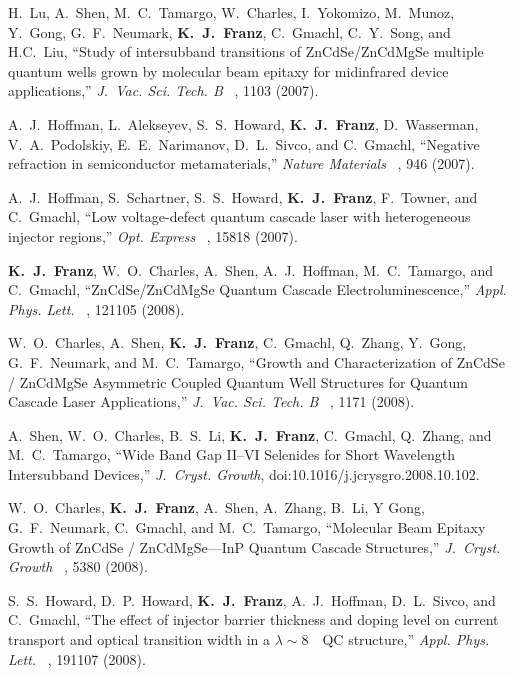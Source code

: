 \begin{list}{}{
  \setlength{\leftmargin}{0.25in}
  \setlength{\rightmargin}{0.25in}
  \setlength{\itemsep}{6pt}
}
\item H.~Lu, A.~Shen, M.~C.~Tamargo, W.~Charles, I.~Yokomizo, M.~Munoz, Y.~Gong, G.~F.~Neumark, \textbf{K.~J.~Franz}, C.~Gmachl, C.~Y.~Song, and H.C.~Liu, ``Study of intersubband transitions of ZnCdSe/ZnCdMgSe multiple quantum wells grown by molecular beam epitaxy for midinfrared device applications,'' \emph{J.~Vac. Sci. Tech. B}~ , 1103 (2007).
\item A.~J.~Hoffman, L.~Alekseyev, S.~S.~Howard, \textbf{K.~J.~Franz}, D.~Wasserman, V.~A.~Podolskiy, E.~E.~Narimanov, D.~L.~Sivco, and C.~Gmachl, ``Negative refraction in semiconductor metamaterials,'' \emph{Nature Materials}~ , 946 (2007).
\item A.~J.~Hoffman, S.~Schartner, S.~S.~Howard, \textbf{K.~J.~Franz}, F.~Towner, and C.~Gmachl, ``Low voltage-defect quantum cascade laser with heterogeneous injector regions,'' \emph{Opt. Express}~ , 15818 (2007).
\item \textbf{K.~J.~Franz}, W.~O.~Charles, A.~Shen, A.~J.~Hoffman, M.~C.~Tamargo, and C.~Gmachl, ``ZnCdSe/ZnCdMgSe Quantum Cascade Electroluminescence,'' \emph{Appl. Phys. Lett.}~  , 121105 (2008).
\item W.~O.~Charles, A.~Shen, \textbf{K.~J.~Franz}, C.~Gmachl, Q.~Zhang, Y.~Gong, G.~F.~Neumark, and M.~C.~Tamargo, ``Growth and Characterization of ZnCdSe / ZnCdMgSe Asymmetric Coupled Quantum Well Structures for Quantum Cascade Laser Applications,'' \emph{J.~Vac. Sci. Tech. B}~ , 1171 (2008).
\item A.~Shen, W.~O.~Charles, B.~S.~Li, \textbf{K.~J.~Franz}, C.~Gmachl, Q.~Zhang, and M.~C.~Tamargo, ``Wide Band Gap II--VI Selenides for Short Wavelength Intersubband Devices,''  \emph{J.~Cryst. Growth}, doi:10.1016/j.jcrysgro.2008.10.102.
\item W.~O.~Charles, \textbf{K.~J.~Franz}, A.~Shen, A.~Zhang, B.~Li, Y Gong, G.~F.~Neumark,  C.~Gmachl, and M.~C.~Tamargo, ``Molecular Beam Epitaxy Growth of ZnCdSe / ZnCdMgSe---InP Quantum Cascade Structures,'' \emph{J.~Cryst. Growth}~ , 5380 (2008).
\pagebreak
\item S.~S.~Howard, D.~P.~Howard, \textbf{K.~J.~Franz}, A.~J.~Hoffman, D.~L.~Sivco, and C.~Gmachl, ``The effect of injector barrier thickness and doping level on current transport and optical transition width in a $\lambda\sim8$~\um\ QC structure,'' \emph{Appl. Phys. Lett.}~ , 191107 (2008).

\end{list}
